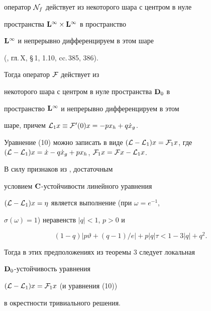 \begin{exam}
оператор ${\cal N}_f$ действует из некоторого шара с центром в нуле


пространства $\bold {L}^{\infty}\times\bold {L}^{\infty}$ в пространство


$\bold {L}^{\infty}$ и непрерывно дифференцируем в этом шаре


(\cite{14}, гл.\,X, \S\,1, 1.10, cc.\,385, 386).


Тогда оператор $\cal F$ действует из


некоторого шара с центром в нуле пространства $\bold {D}_0$ в


пространство $\bold {L}^{\infty}$ и непрерывно дифференцируем в этом


шаре, причем ${\cal L}_1x\equiv{\cal F}'(0)x=-px_h+q\Dot x_g$.


Уравнение (10) можно записать в виде $({\cal L}-{\cal L}_1)x={\cal


F}_1x$, где $({\cal L}-{\cal L}_1)x=\Dot x-q\Dot x_g+px_h$, ${\cal


F}_1x={\cal F}x-{\cal L}_1x$.





В силу признаков из \cite{15}, \cite{16} достаточным


условием $\bold {C}$-устойчивости линейного уравнения


$({\cal L}-{\cal L}_1)x=\eta$ является выполнение (при $\omega=e^{-1}$,


$\sigma(\omega)=1$) неравенств $|q|<1$, $p>0$ и


$$


(1-q)|p\vartheta+(q-1)/e|+p|q|\tau<1-3|q|+q^2.


$$





Тогда в этих предположениях из теоремы 3 следует локальная


$\bold {D}_0$-устойчивость уравнения


$({\cal L}-{\cal L}_1)x={\cal F}_1x$ (и уравнения (10))


в окрестности тривиального решения.


\end{exam}





